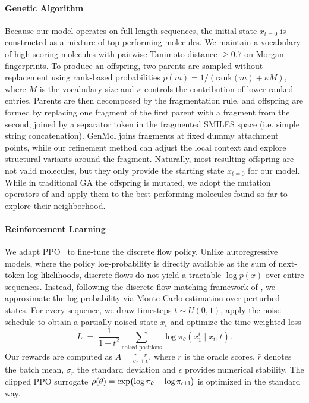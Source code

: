 \documentclass{article} %
\begin{document}
\paragraph{Genetic Algorithm}
Because our model operates on full-length sequences, the initial state $x_{t=0}$ is constructed as a mixture of top-performing molecules. We maintain a vocabulary of high-scoring molecules with pairwise Tanimoto distance $\geq 0.7$ on Morgan fingerprints. To produce an offspring, two parents are sampled without replacement using rank-based probabilities $p(m)=1/(\text{rank}(m)+\kappa M)$, where $M$ is the vocabulary size and $\kappa$ controls the contribution of lower-ranked entries. Parents are then decomposed by the fragmentation rule, and offspring are formed by replacing one fragment of the first parent with a fragment from the second, joined by a separator token in the fragmented SMILES space (i.e. simple string concatenation). GenMol joins fragments at fixed dummy attachment points, while our refinement method can adjust the local context and explore structural variants around the fragment. Naturally, most resulting offspring are not valid molecules, but they only provide the starting state $x_{t=0}$ for our model. While in traditional GA the offspring is mutated, we adopt the mutation operators of \cite{graphga} and apply them to the best-performing molecules found so far to explore their neighborhood.

\paragraph{Reinforcement Learning}
We adapt PPO~\citep{schulman2017proximal} to fine-tune the discrete flow policy.
Unlike autoregressive models, where the policy log-probability is directly available as the sum of next-token log-likelihoods, discrete flows do not yield a tractable $\log p(x)$ over entire sequences.
Instead, following the discrete flow matching framework of \cite{gat2024discrete_flow_matching}, we approximate the log-probability via Monte Carlo estimation over perturbed states.
For every sequence, we draw timesteps $t\sim U(0,1)$, apply the noise schedule to obtain a partially noised state $x_t$ and optimize the time-weighted loss
\begin{equation}
L \;=\; \frac{1}{1-t^2}\sum_{\text{noised positions}}\log \pi_\theta(x_1^i \mid x_t, t).
\end{equation}
Our rewards are computed as $A = \frac{r-\bar{r}}{\sigma_r + \epsilon}$,
where $r$ is the oracle scores, $\bar{r}$ denotes the batch mean, $\sigma_r$ the standard deviation and $\epsilon$ provides numerical stability. The clipped PPO surrogate
$
\rho(\theta) = \exp\bigl(\log\pi_\theta - \log\pi_{\rm old}\bigr)
$
is optimized in the standard way.
\end{document}
